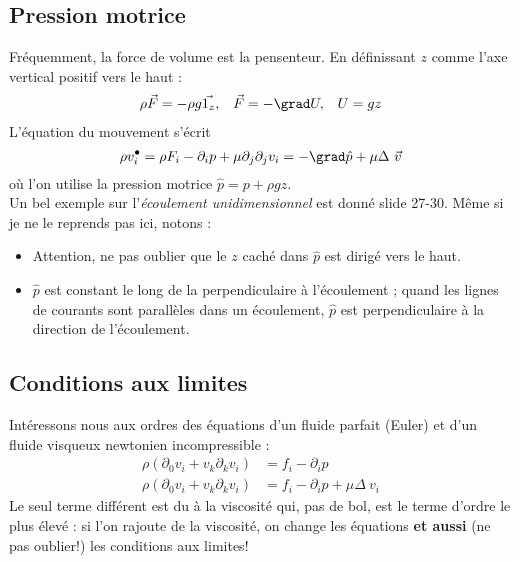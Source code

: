 		
\subsection{Pression motrice}
Fréquemment, la force de volume est la pensenteur. En définissant $z$ comme l'axe
vertical positif vers le haut :
\begin{equation}
	\begin{array}{ccc}
		\rho\vec{F}=-\rho g\vec{1_z}, & \vec{F}=-\grad U, & U=gz 
	\end{array}
\end{equation}
L'équation du mouvement s'écrit 
\begin{equation}
	\rho v_i^\bullet = \rho F_i - \partial_i p +\mu\partial_j\partial_jv_i = -\grad\hat{p}
	+\mu\Delta\ \vec v
\end{equation}
où l'on utilise la pression motrice $\hat{p}=p+\rho gz$.\\
Un bel exemple sur l'\textit{écoulement unidimensionnel} est donné slide 27-30. Même 
si je ne le reprends pas ici, notons :
\begin{itemize}
	\item Attention, ne pas oublier que le $z$ caché dans $\hat{p}$ est dirigé vers le 
	      haut.
	\item $\hat{p}$ est constant le long de la perpendiculaire à l'écoulement ; quand les 
	      lignes de courants sont parallèles dans un écoulement, $\hat{p}$ est perpendiculaire 
	      à la direction de l'écoulement.
\end{itemize}
	
	
\subsection{Conditions aux limites}
Intéressons nous aux ordres des équations d'un fluide parfait (Euler) et d'un fluide 
visqueux newtonien incompressible :
\begin{equation}
	\begin{array}{ll}
		\rho(\partial_0v_i + v_k\partial_kv_i) & = f_i-\partial_i p                  \\
		\rho(\partial_0v_i + v_k\partial_kv_i) & = f_i-\partial_i p + \mu\Delta\ v_i 
	\end{array}
\end{equation}
Le seul terme différent est du à la viscosité qui, pas de bol, est le terme d'ordre 
le plus élevé : si l'on rajoute de la viscosité, on change les équations \textbf{et 
aussi} (ne pas oublier!) les conditions aux limites!
	
